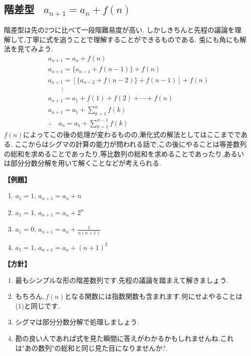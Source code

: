 
  \subsection{階差型 \, $a_{n+1}=a_n+f(n)$}
    階差型は先の2つに比べて一段階難易度が高い.
    しかしきちんと先程の議論を理解して,丁寧に式を追うことで理解することができるものである.
    兎にも角にも解法を見てみよう.
    \begin{align*}
      &a_{n+1}=a_n+f(n)\\
      &a_{n+1}=\{a_{n-1}+f(n-1)\}+f(n)\\
      &a_{n+1}=\left[\{a_{n-2}+f(n-2)\}+f(n-1)\right]+f(n)\\
      &\qquad \vdots\\
      &a_{n+1}=a_1+f(1)+f(2)+\cdots+f(n)\\
      &a_{n+1}=a_1+\sum_{k=1}^{n} f(k)\\
      &\therefore \quad a_n=a_1+\sum_{k=1}^{n-1} f(k)
    \end{align*}
    $f(n)$によってこの後の処理が変わるものの,漸化式の解法としてはここまでである.
    ここからはシグマの計算の能力が問われる話で,この後にやることは等差数列の総和を求めることであったり,等比数列の総和を求めることであったり,あるいは部分分数分解を用いて解くことなどが考えられる.

    \noindent \textbf{【例題】}
    \begin{enumerate}[label=(\arabic*),parsep=3pt]
      \item $\displaystyle a_1=1,\, a_{n+1}=a_n+n$
      \item $\displaystyle a_1=1,\, a_{n+1}=a_n+2^n$
      \item $\displaystyle a_1=0,\, a_{n+1}=a_n+\frac{1}{n(n+1)}$
      \item $\displaystyle a_1=1,\, a_{n+1}=a_n+(n+1)^2$
    \end{enumerate}

    \noindent\textbf{【方針】}
    \begin{enumerate}[label=(\arabic*),parsep=3pt]
      \item 最もシンプルな形の階差数列です.先程の議論を踏まえて解きましょう.
      \item もちろん,\,$f(n)$となる関数には指数関数も含まれます.何にせよやることは\,(1)と同じです.
      \item シグマは部分分数分解で処理しましょう.
      \item 勘の良い人であれば式を見た瞬間に答えがわかるかもしれませんね.これは"あの数列"の総和と同じ見た目になりませんか?.
    \end{enumerate}

